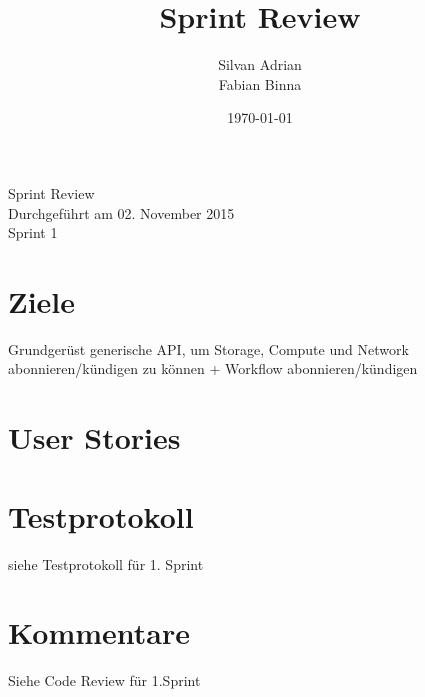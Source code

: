 \documentclass[11pt]{scrartcl}
\title{Sprint Review}
\author{Silvan Adrian \\ Fabian Binna}
\date{\today{}}
\begin{document}
\def\arraystretch{1.5}
\begin{titlepage}
\begin{center}
\vspace{10em}

\vspace{10em}
\end{center}
\begin{center}
\huge {Sprint Review}\\

Durchgeführt am 02. November 2015\\
Sprint 1
\end{center}

\end{titlepage}

\newpage
\tableofcontents
\newpage

\section{Ziele}
Grundgerüst generische API, um Storage, 
Compute und Network abonnieren/kündigen zu können + 
Workflow abonnieren/kündigen

\section{User Stories}



\newpage

\section{Testprotokoll}

siehe Testprotokoll für 1. Sprint

\section{Kommentare}

Siehe Code Review für 1.Sprint
\end{document}
